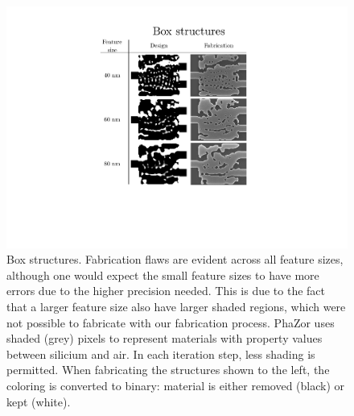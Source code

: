  \begin{figure}[H]
    \centering
    \includegraphics[trim= 8.35cm 2.73cm 8.35cm 2.73cm,clip,width=\textwidth]{fig/boxstructures.pdf}
    \vspace{-2cm}
    \caption{Box structures. Fabrication flaws are evident across all feature sizes, although one would expect the small feature sizes to have more errors due to the higher precision needed. This is due to the fact that a larger feature size also have larger shaded regions, which were not possible to fabricate with our fabrication process. PhaZor uses shaded (grey) pixels to represent materials with property values between silicium and air. In each iteration step, less shading is permitted. When fabricating the structures shown to the left, the coloring is converted to binary: material is either removed (black) or kept (white).}
    \label{fig:BoxStructures}
 \end{figure}

 \newpage
